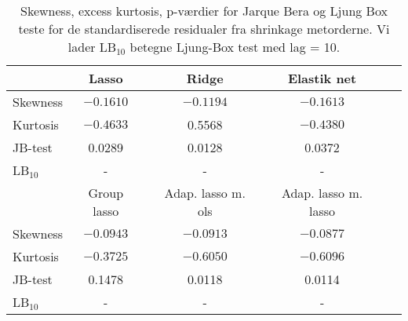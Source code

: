 \begin{table}
\center
\begin{tabular}{lrrrrrrrrrr} 
\toprule
& \multicolumn{2}{c}{Lasso} && \multicolumn{2}{c}{Ridge } && \multicolumn{2}{c}{Elastik net} \\ \midrule
Skewness & \multicolumn{2}{c}{$-0.1610$} &&\multicolumn{2}{c}{$-0.1194$} && \multicolumn{2}{c}{$- 0.1613$} \\
Kurtosis & \multicolumn{2}{c}{$ -0.4633 $} && \multicolumn{2}{c}{0.5568} &&\multicolumn{2}{c}{$-0.4380$} \\
JB-test & \multicolumn{2}{c}{0.0289} && \multicolumn{2}{c}{0.0128} && \multicolumn{2}{c}{0.0372}  \\
LB$_{10}$ &  \multicolumn{2}{c}{-} &&  \multicolumn{2}{c}{-} &&  \multicolumn{2}{c}{-} \\  \bottomrule \toprule
 & \multicolumn{2}{c}{Group lasso} && \multicolumn{2}{c}{Adap. lasso m. ols}  && \multicolumn{2}{c}{Adap. lasso m. lasso} \\ \midrule
Skewness & \multicolumn{2}{c}{$-0.0943$} &&  \multicolumn{2}{c}{$-0.0913$} && \multicolumn{2}{c}{$-0.0877$} \\
Kurtosis & \multicolumn{2}{c}{$-0.3725$} &&   \multicolumn{2}{c}{$-0.6050 $} && \multicolumn{2}{c}{$-0.6096$} \\
JB-test & \multicolumn{2}{c}{0.1478}  &&  \multicolumn{2}{c}{0.0118} &&  \multicolumn{2}{c}{0.0114} \\ 
LB$_{10}$ &  \multicolumn{2}{c}{-} &&  \multicolumn{2}{c}{-} &&  \multicolumn{2}{c}{-} \\ \bottomrule
 \end{tabular}
\caption{Skewness, excess kurtosis, p-værdier for Jarque Bera og Ljung Box teste for de standardiserede residualer fra shrinkage metorderne. Vi lader LB$_{10}$ betegne Ljung-Box test med lag = 10. } \label{tab:res_shrinkage_tab}
\end{table}